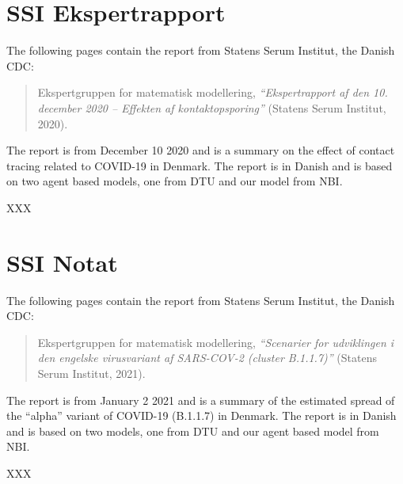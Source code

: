 
\chapter{SSI Ekspertrapport}
\label{appendix:ssi-report}

The following pages contain the report from Statens Serum Institut, the Danish CDC:
\begin{quote}
    Ekspertgruppen for matematisk modellering, \emph{``Ekspertrapport af den 10. december 2020 -- Effekten af kontaktopsporing''} (Statens Serum Institut, 2020).
\end{quote}
The report is from December 10 2020 and is a summary on the effect of contact tracing related to COVID-19 in Denmark. The report is in Danish and is based on two agent based models, one from DTU and our model from NBI.

\clearpage
% 
% 
XXX



\chapter{SSI Notat}
\label{appendix:ssi-notat}

The following pages contain the report from Statens Serum Institut, the Danish CDC:
\begin{quote}
    Ekspertgruppen for matematisk modellering, \emph{``Scenarier for udviklingen i den engelske virusvariant af SARS-COV-2 (cluster B.1.1.7)''} (Statens Serum Institut, 2021).
\end{quote}
The report is from January 2 2021 and is a summary of the estimated spread of the ``alpha'' variant of COVID-19 (B.1.1.7) in Denmark. The report is in Danish and is based on two models, one from DTU and our agent based model from NBI.

\clearpage
% 
XXX


